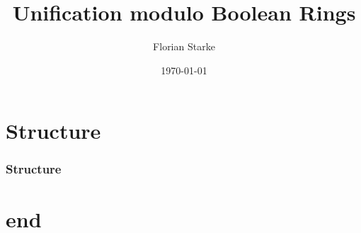 \documentclass{beamer}
\title{Unification modulo Boolean Rings}
\author{Florian	Starke}
\date{\today}
\begin{document}
\maketitle
\addtocounter{framenumber}{-1}


\section*{Structure}
\begin{frame}
\frametitle{Structure}
\tableofcontents 
\end{frame}


\section*{end}
\end{document}
